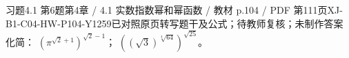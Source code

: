 \par\noindent\begin{minipage}{\linewidth}
\begin{bankitem}{习题4.1 第6题}{第4章 / 4.1 实数指数幂和幂函数 / 教材 p.104 / PDF 第111页}{XJ-B1-C04-HW-P104-Y1259}{已对照原页转写题干及公式；待教师复核；未制作答案}
化简：
$\left(\pi^{\sqrt2+1}\right)^{\sqrt2-1}$；
$\left(\left(\sqrt3\right)^{\sqrt[4]{64}}\right)^{\sqrt{25}}$。
\end{bankitem}
\end{minipage}\par\medskip
